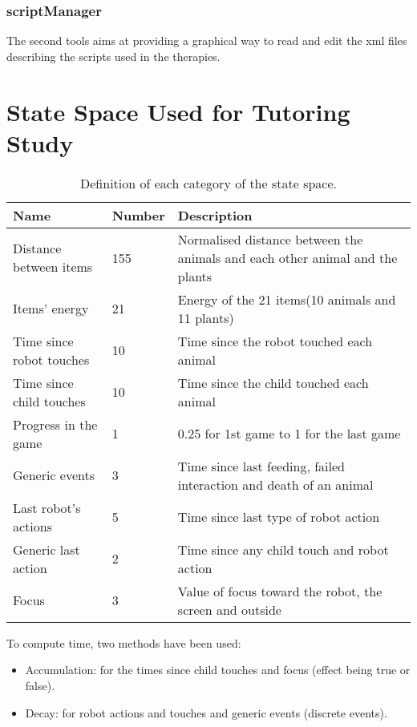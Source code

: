 \subsection{scriptManager}

The second tools aims at providing a graphical way to read and edit the xml files describing the scripts used in the therapies.

\cleartooddpage
\chapter{State Space Used for Tutoring Study} \label{ann:state}
\begin{table}[ht]
	\centering
	\caption{Definition of each category of the state space.}
	\label{tab:tutoring_policies}
	\begin{tabularx}{\textwidth}{@{}llX@{}}\toprule
		Name & Number & Description \\
		\midrule
		Distance between items & 155 & Normalised distance between the animals and each other animal and the plants\\
		Items' energy & 21 & Energy of the 21 items(10 animals and 11 plants)\\
		Time since robot touches & 10 & Time since the robot touched each animal\\ %
		Time since child touches & 10 & Time since the child touched each animal\\ %
		Progress in the game & 1 & 0.25 for 1st game to 1 for the last game\\ 
		Generic events & 3 & Time since last feeding, failed interaction and death of an animal\\ %
		Last robot's actions & 5 & Time since last type of robot action\\ %
		Generic last action & 2 & Time since any child touch and robot action\\ %
		Focus & 3 & Value of focus toward the robot, the screen and outside\\ %
		\bottomrule
	\end{tabularx}
\end{table}

To compute time, two methods have been used:
\begin{itemize}
	\item Accumulation: for the times since child touches and focus (effect being true or false).
	\item Decay: for robot actions and touches and generic events (discrete events).
\end{itemize}

